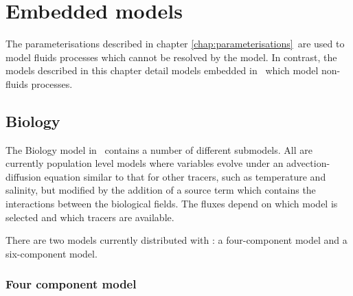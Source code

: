 \chapter{Embedded models}\label{chap:embedded}

The parameterisations described in chapter \ref{chap:parameterisations}\ are
used to model fluids processes which cannot be resolved by the model. In
contrast, the models described in this chapter detail models embedded in
\fluidity\ which model non-fluids processes.

\section{Biology}
\label{sec:biology_model}
The Biology model in \fluidity\ contains a number of different submodels. All are
currently population level models where variables evolve under an 
advection-diffusion equation similar to that for other tracers, such as 
temperature and salinity, but modified by the
addition of a source term which contains the interactions between the
biological fields. The fluxes depend on which model is selected and which
tracers are available. 

There are two models currently distributed with \fluidity: a four-component model
and a six-component model.

\subsection{Four component model}

